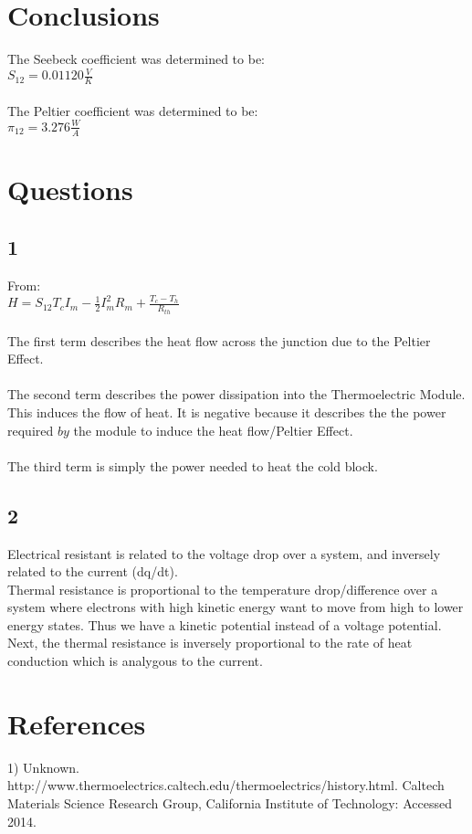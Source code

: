 \documentclass{article}
\begin{document}
\section{Conclusions}
The Seebeck coefficient was determined to be:\\
$S_{12}=0.01120\frac{V}{K}$\\\\
The Peltier coefficient was determined to be:\\
$\pi_{12}=3.276\frac{W}{A}$
\section{Questions}
\subsection{1}
From:\\
$H=S_{12}T_cI_m-\frac{1}{2}I^2_mR_m+\frac{T_c-T_h}{R_{th}}$\\\\
The first term describes the heat flow across the junction due to the Peltier Effect.\\\\
The second term describes the power dissipation into the Thermoelectric Module. This induces the flow of heat. It is negative because it describes the the power required $by$ the module to induce the heat flow/Peltier Effect.\\\\
The third term is simply the power needed to heat the cold block.
\subsection{2}
Electrical resistant is related to the voltage drop over a system, and inversely related to the current (dq/dt).\\
Thermal resistance is proportional to the temperature drop/difference over a system where electrons with high kinetic energy want to move from high to lower energy states. Thus we have a kinetic potential instead of a voltage potential.\\
Next, the thermal resistance is inversely proportional to the rate of heat conduction which is analygous to the current.
\section{References}
1) Unknown. http://www.thermoelectrics.caltech.edu/thermoelectrics/history.html. Caltech Materials Science Research Group, California Institute of Technology: Accessed 2014.
\end{document}
